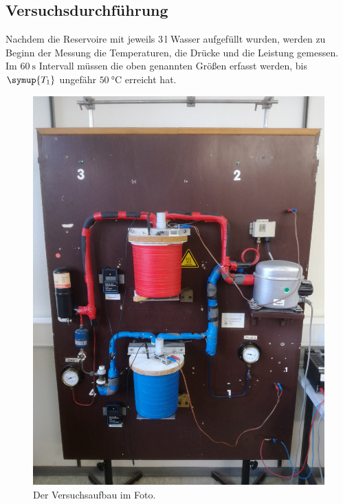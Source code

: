 \subsection{Versuchsdurchführung}
Nachdem die Reservoire mit jeweils 3\,$\si{\litre}$ Wasser aufgefüllt wurden,
werden zu Beginn der Messung  die Temperaturen, die Drücke und die Leistung gemessen.
Im $\SI{60}{\second}$ Intervall müssen die oben genannten Größen erfasst werden, bis
$\symup{T_1}$ ungefähr $\SI{50}{\celsius}$ erreicht hat.
\begin{figure}
  \centering
  \includegraphics[scale=0.07]{foto.jpg}
  \caption{Der Versuchsaufbau im Foto.}
  \label{fig:2}
\end{figure}
